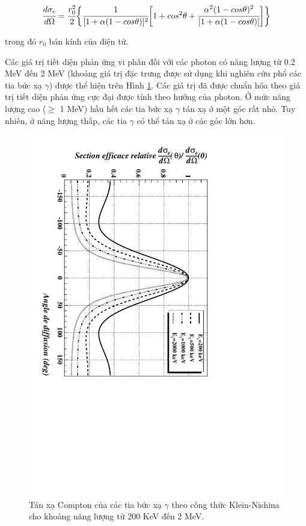 \begin{equation}
\cfrac{d \sigma_{e}}{d \Omega} = \cfrac{r_{0}^{2}}{2} 
\biggl\{
\cfrac{1}{[1+\alpha(1-cos\theta)]^{2}}
\biggl [
1+cos^{2}\theta+\cfrac{\alpha^{2}(1-cos\theta)^{2}}{[1+\alpha(1-cos\theta)]}
\biggr ]
\biggr\}
\end{equation}

trong đó $r_{0}$ bán kính của điện tử. 

Các giá trị tiết diện phản ứng vi phân đối với các photon có năng lượng từ 0.2 MeV đến 2 MeV (khoảng giá trị đặc trưng được sử dụng khi nghiên cứu phổ các tia bức xạ $\gamma$) được thể hiện trên Hình \ref{fig:klein}. Các giá trị đã được chuẩn hóa theo giá trị tiết diện phản ứng cực đại được tính theo hướng của photon. Ở mức năng lượng cao ($\geq$ 1 MeV) hầu hết các tia bức xạ $\gamma$ tán xạ ở một góc rất nhỏ. Tuy nhiên, ở năng lượng thấp, các tia $\gamma$ có thể tán xạ ở các góc lớn hơn. 

\begin{figure}[!h]
\centering
\includegraphics[height=0.8\textwidth,angle = 90.0 ]{figure/fig_cosolythuyet/klein.pdf}
\caption{Tán xạ Compton của các tia bức xạ $\gamma$ theo công thức Klein-Nishina cho khoảng năng lượng từ 200 KeV đến 2 MeV.}
\label{fig:klein}
\end{figure}
